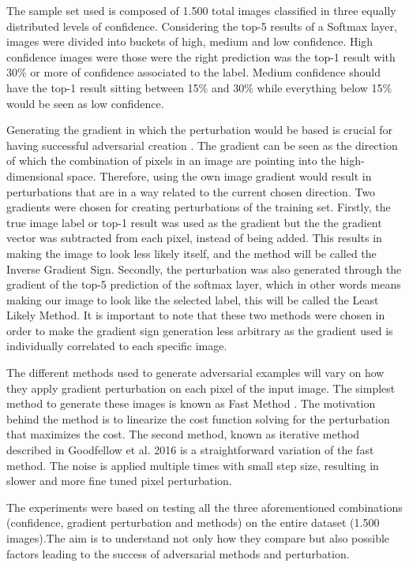 \documentclass[10pt,journal,compsoc]{IEEEtran}
\begin{document}
The sample set used is composed of 1.500 total images classified in three equally distributed levels of confidence. Considering the top-5 results of a Softmax layer, images were divided into buckets of high, medium and low confidence. High confidence images were those were the right prediction was the top-1 result with 30\% or more of confidence associated to the label. Medium confidence should have the top-1 result sitting between 15\% and 30\% while everything below 15\% would be seen as low confidence.

Generating the gradient in which the perturbation would be based is crucial for having successful adversarial creation \cite{goodfellow2016}. The gradient can be seen as the direction of which the combination of pixels in an image are pointing into the high-dimensional space. Therefore, using the own image gradient would result in perturbations that are in a way related to the current chosen direction. Two gradients were chosen for creating perturbations of the training set. Firstly, the true image label or top-1 result was used as the gradient but the the gradient vector was subtracted from each pixel, instead of being added. This results in making the image to look less likely itself, and the method will be called the Inverse Gradient Sign. Secondly,  the perturbation was also generated through the gradient of the top-5 prediction of the softmax layer, which in other words means making our image to look like the selected label, this will be called the Least Likely Method. It is important to note that these two methods were chosen in order to make the gradient sign generation less arbitrary as the gradient used is individually correlated to each specific image.

The different methods used to generate adversarial examples will vary on how they apply gradient perturbation on each pixel of the input image. The simplest method to generate these images is known as Fast Method \cite{goodfellow2014}. The motivation behind the method is to linearize the cost function solving for the perturbation that maximizes the cost. The second method, known as iterative method described in Goodfellow et al. 2016 \cite{goodfellow2016} is a straightforward variation of the fast method. The noise is applied multiple times with small step size, resulting in slower and more fine tuned pixel perturbation.

The experiments were based on testing all the three aforementioned combinations (confidence, gradient perturbation and methods) on the entire dataset (1.500 images).The aim is to understand not only how they compare but also possible factors leading to the success of adversarial methods and perturbation.
\end{document}
